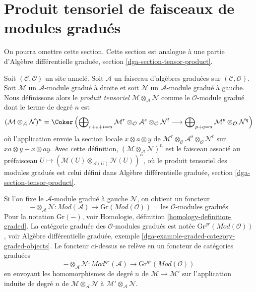 \section{Produit tensoriel de faisceaux de modules gradués}
\label{section-tensor-product}

\noindent
On pourra omettre cette section. Cette section est analogue à une partie
d'Algèbre différentielle graduée, section \ref{dga-section-tensor-product}.

\medskip\noindent
Soit $(\mathcal{C}, \mathcal{O})$ un site annelé. Soit $\mathcal{A}$ un
faisceau d'algèbres graduées sur $(\mathcal{C}, \mathcal{O})$.
Soit $\mathcal{M}$ un $\mathcal{A}$-module gradué à droite
et soit $\mathcal{N}$ un $\mathcal{A}$-module gradué à gauche.
Nous définissons alors le {\it produit tensoriel}
$\mathcal{M} \otimes_\mathcal{A} \mathcal{N}$
comme le $\mathcal{O}$-module gradué dont le terme de degré $n$
est $$
(\mathcal{M} \otimes_\mathcal{A} \mathcal{N})^n
= \Coker\left(
\bigoplus\nolimits_{r + s + t = n} \mathcal{M}^r \otimes_\mathcal{O}
\mathcal{A}^s \otimes_\mathcal{O} \mathcal{N}^t
\longrightarrow
\bigoplus\nolimits_{p + q = n} \mathcal{M}^p \otimes_\mathcal{O} \mathcal{N}^q
\right)
$$
où l'application envoie la section locale $x \otimes a \otimes y$
de $\mathcal{M}^r \otimes_\mathcal{O} \mathcal{A}^s
\otimes_\mathcal{O} \mathcal{N}^t$
sur $xa \otimes y - x \otimes ay$.
Avec cette définition,
$(\mathcal{M} \otimes_\mathcal{A} \mathcal{N})^n$ est
le faisceau associé au préfaisceau
$U \mapsto (\mathcal{M}(U) \otimes_{\mathcal{A}(U)} \mathcal{N}(U))^n$, où le
produit tensoriel des modules gradués est celui défini dans
Algèbre différentielle graduée, section \ref{dga-section-tensor-product}.

\medskip\noindent
Si l'on fixe le $\mathcal{A}$-module gradué à gauche $\mathcal{N}$,
on obtient un foncteur
$$
- \otimes_\mathcal{A} \mathcal{N} :
\textit{Mod}(\mathcal{A})
\longrightarrow
\text{Gr}(\textit{Mod}(\mathcal{O})) =
\text{les }\mathcal{O}\text{-modules gradués}
$$
Pour la notation $\text{Gr}(-)$, voir
Homologie, définition \ref{homology-definition-graded}.
La catégorie graduée des $\mathcal{O}$-modules gradués est notée
$\text{Gr}^{gr}(\textit{Mod}(\mathcal{O}))$, voir
Algèbre différentielle graduée, exemple
\ref{dga-example-graded-category-graded-objects}.
Le foncteur ci-dessus se relève en un foncteur de catégories graduées
$$
- \otimes_\mathcal{A} \mathcal{N} :
\textit{Mod}^{gr}(\mathcal{A})
\longrightarrow
\text{Gr}^{gr}(\textit{Mod}(\mathcal{O}))
$$
en envoyant les homomorphismes de degré $n$ de $\mathcal{M} \to \mathcal{M}'$
sur l'application induite de degré $n$ de
$\mathcal{M} \otimes_\mathcal{A} \mathcal{N}$ à
$\mathcal{M}' \otimes_\mathcal{A} \mathcal{N}$.






